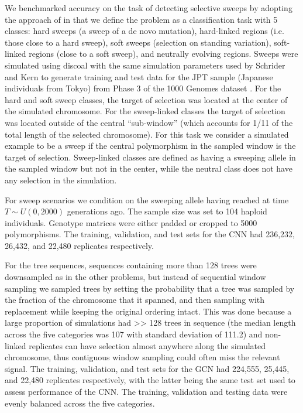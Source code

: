 We benchmarked accuracy on the task of detecting selective sweeps by adopting the approach of \cite{flagelUnreasonableEffectivenessConvolutional2019,schriderHICRobustIdentification2016} in that we define the problem as a classification task with 5 classes: hard sweeps (a sweep of a de novo mutation), hard-linked regions (i.e. those close to a hard sweep), soft sweeps (selection on standing variation), soft-linked regions (close to a soft sweep), and neutrally evolving regions. Sweeps were simulated using discoal \cite{kernDiscoalFlexibleCoalescent2016} with the same simulation parameters used by Schrider and Kern \cite{schriderSoftSweepsAre2017} to generate training and test data for the JPT sample (Japanese individuals from Tokyo) from Phase 3 of the 1000 Genomes dataset \cite{autonGlobalReferenceHuman2015}. 
For the hard and soft sweep classes, the target of selection was located at the center of the simulated chromosome. For the sweep-linked classes the target of selection was located outside of the central “sub-window” (which accounts for 1/11 of the total length of the selected chromosome). For this task we consider a simulated example to be a sweep if the central polymorphism in the sampled window is the target of selection. Sweep-linked classes are defined as having a sweeping allele in the sampled window but not in the center, while the neutral class does not have any selection in the simulation.

For sweep scenarios we condition on the sweeping allele having reached at time $T \sim U(0, 2000)$ generations ago. The sample size was set to 104 haploid individuals. Genotype matrices were either padded or cropped to 5000 polymorphisms.  The training, validation, and test sets for the CNN had 236,232, 26,432, and 22,480 replicates respectively.

For the tree sequences, sequences containing more than 128 trees were downsampled as in the other problems, but instead of sequential window sampling we sampled trees by  setting the probability that a  tree was sampled by the fraction of the chromosome that it spanned, and then sampling with replacement while keeping the original ordering intact. This was done because a large proportion of simulations had >> 128 trees in sequence (the median length across the five categories was 107 with standard deviation of 111.2) and non-linked replicates can have selection almost anywhere along the simulated chromosome, thus contiguous window sampling could often miss the relevant signal. The training, validation, and test sets for the GCN had 224,555, 25,445, and 22,480 replicates respectively, with the latter being the same test set used to assess performance of the CNN. The training, validation and testing data were evenly balanced across the five categories.

